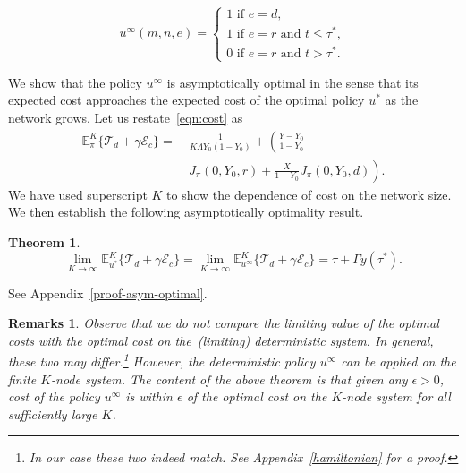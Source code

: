 \documentclass[10pt,journal,letterpaper]{IEEEtran}
\newtheorem{theorem}{Theorem}[section]
\newtheorem{remarks}{Remarks}[section]
\newcommand{\remove}[1]{}
\begin{document}
\begin{equation*}
u^{\infty}(m,n,e) = \begin{cases}
 1 \mbox{ if } e = d,\\
 1 \mbox{ if } e = r \mbox{ and } t \leq \tau^{\ast},\\
 0 \mbox{ if } e = r \mbox{ and } t > \tau^{\ast}.\end{cases}
\end{equation*}

We show that the policy $u^{\infty}$ is asymptotically optimal in the sense that
 its expected cost approaches the expected cost of the optimal
policy $u^{\ast}$ as the network grows.
Let us restate~\eqref{eqn:cost} as
\begin{align*}
\mathbb{E}^K_{\pi}\{\mathcal{T}_d + \gamma\mathcal{E}_c\} =&~\frac{1}{K\Lambda Y_0(1-Y_0)} + \left(\frac{Y-Y_0}{1-Y_0} \right. \\
&~\left.J_{\pi}(0,Y_0,r) + \frac{X}{1-Y_0}J_{\pi}(0,Y_0,d)\right) \label{eqn:cost}.
\end{align*}
We have used superscript $K$ to show the dependence of cost on the
network size. We then establish the following asymptotically optimality result.
\begin{theorem}
\label{theorem:asym-optimal}
\[
\lim_{K \rightarrow \infty} \mathbb{E}^K_{u^{\ast}}\{\mathcal{T}_d + \gamma\mathcal{E}_c\} =  \lim_{K \rightarrow \infty} \mathbb{E}^K_{u^{\infty}}\{\mathcal{T}_d + \gamma\mathcal{E}_c\} = \tau + \Gamma y(\tau^{\ast}).
\]
\remove{
\[
\lim_{K \rightarrow \infty} \left(\mathbb{E}^K_{u^{\infty}}\{\mathcal{T}_d + \gamma\mathcal{E}_c\} - \mathbb{E}^K_{u^{\ast}}\{\mathcal{T}_d + \gamma\mathcal{E}_c\}\right) = 0.
\]
}
\end{theorem}
\begin{IEEEproof}
See Appendix~\ref{proof-asym-optimal}.
\end{IEEEproof}
\begin{remarks}
\label{remark:cost-comparision}
Observe that we do not compare the limiting value of the optimal costs with the 
optimal cost on the~(limiting) deterministic system. In general, these two may differ.\footnote{In our case these two indeed match. See Appendix~\ref{hamiltonian} for a proof.} 
However, the deterministic policy $u^{\infty}$ can be applied on the finite $K$-node system. 
The content of the above theorem is that given any $\epsilon > 0$, cost of the policy $u^{\infty}$ 
is within $\epsilon$ of the optimal cost {\em on the $K$-node system} for all sufficiently large $K$.
\end{remarks}
\end{document}
